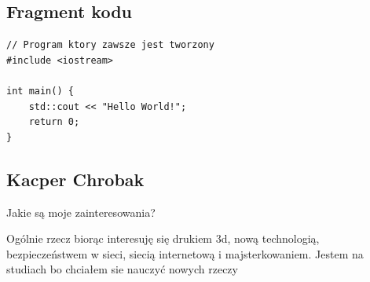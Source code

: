 \documentclass[12pt,a4paper]{article}
\begin{document}
\subsection{Fragment kodu}
\begin{lstlisting}
// Program ktory zawsze jest tworzony
#include <iostream>

int main() {
    std::cout << "Hello World!";
    return 0;
}
\end{lstlisting}
\subsection{Kacper Chrobak}
\begin{center}
    Jakie są moje zainteresowania?
\end{center}
Ogólnie rzecz biorąc interesuję się drukiem 3d, nową technologią, bezpieczeństwem w sieci, siecią internetową i majsterkowaniem. Jestem na studiach bo chciałem sie nauczyć nowych rzeczy
\end{document}
